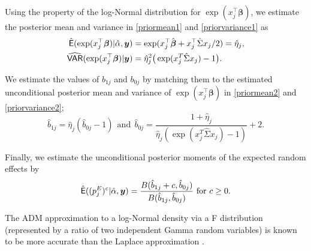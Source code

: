 \documentclass[article]{jss}
\begin{document}
Using the property of the log-Normal distribution for $\exp(x_j^\top\boldsymbol{\beta})$, we estimate the posterior mean and variance in  \eqref{priormean1} and \eqref{priorvariance1} as
\begin{align}
\hat{\mathsf{E}}(\exp(x_j^\top\boldsymbol{\beta})\vert\hat{\alpha}, \boldsymbol{y})&=\exp(x_j^\top\hat{\boldsymbol{\beta}}+x_j^\top\hat{\Sigma} x_j/2)=\hat{\eta}_j,\label{priormean2}\\
\widehat{\mathsf{VAR}}(\exp(x_j^\top\boldsymbol{\beta})\vert\boldsymbol{y})&=\hat{\eta}^2_j\big(\exp(x_j^{T}\hat{\Sigma} x_j)-1\big).\label{priorvariance2}
\end{align}

We estimate the values of $b_{1j}$ and $b_{0j}$  by matching them to the estimated unconditional posterior mean and variance of $\exp(x_j^\top\boldsymbol{\beta})$ in  \eqref{priormean2} and \eqref{priorvariance2};
\begin{equation}\label{priormeanpara}
\hat{b}_{1j}=\hat{\eta}_j(\hat{b}_{0j}-1)~~\textrm{and}~~\hat{b}_{0j}=\frac{1+\hat{\eta}_j}{\hat{\eta}_j(\exp(x_j^{T}\hat{\Sigma} x_j)-1)}+2.
\end{equation}

Finally, we estimate the unconditional posterior moments of the expected random effects by
\begin{equation}\label{est_exp_randomeffect}
 \hat{\mathsf{E}}((p^E_{j})^c\vert\hat{\alpha}, \boldsymbol{y})=\frac{B(\hat{b}_{1j} + c, \hat{b}_{0j})}{B(\hat{b}_{1j}, \hat{b}_{0j})} \textrm{ for } c\ge0.
\end{equation}

The ADM approximation to a log-Normal density via a F distribution (represented by a ratio of two independent Gamma random variables) is known to be more accurate than the Laplace approximation \citep{carl1988}.

\end{document}
